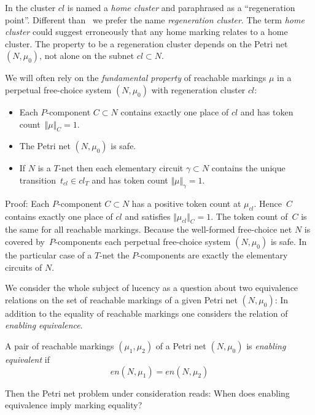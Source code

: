 \documentclass{fundam}
\begin{document}
\noindent In \cite{Aal2018} the cluster $cl$ is named a \emph{home cluster} and paraphrased as a ``regeneration point''. Different than~\cite{Aal2018} we prefer the name \emph{regeneration cluster}. The term \emph{home cluster} could suggest erroneously that any home marking relates to a home cluster. The property to be a regeneration cluster depends on the Petri net $(N,\mu_0)$, not alone on the subnet $cl \subset N$.\medskip

We will often rely on the \emph{fundamental property} of reachable markings $\mu$ in a perpetual free-choice system $(N,\mu_0)$ with regeneration cluster $cl$:
\begin{itemize}
\item Each $P$-component $C \subset N$ contains exactly one place of $cl$ and has token \mbox{count $\Vert \mu \Vert_C=1$}.
\item The Petri net $(N,\mu_0)$ is safe.
\item If $N$ is a $T$-net then each elementary circuit $\gamma \subset N$ contains the unique \mbox{transition $t_{cl} \in cl_T$} and has token count $\Vert \mu \Vert_\gamma =1$.
\end{itemize}

Proof:
 Each $P$-component $C\subset N$ has a positive token count at $\mu_{cl}$. \mbox{Hence $C$} contains exactly one place of $cl$ and satisfies
$\Vert \mu_{cl} \Vert_C=1$. The token count \mbox{of $C$} is the same for all reachable markings. Because the well-formed free-choice net $N$ is covered \mbox{by $P$-components} each perpetual free-choice system $(N,\mu_0)$ is safe. In the particular case of a $T$-net the $P$-components are exactly the elementary circuits of $N$.

\medskip
We consider the whole subject of lucency as a question about two equivalence relations on the set of reachable markings of a given Petri net $(N,\mu_0)$: In addition to the equality of reachable markings one considers the relation of \emph{enabling equivalence}.

\begin{definition}\label{def_enablingequivalence}
A pair of reachable markings $(\mu_1,\mu_2)$ of a Petri net $(N,\mu_0)$ is \emph{enabling equivalent} if
$$en(N,\mu_1)=en(N,\mu_2)$$
\end{definition}
\noindent Then the Petri net problem under consideration reads: When does enabling equivalence imply marking equality?
\end{document}
